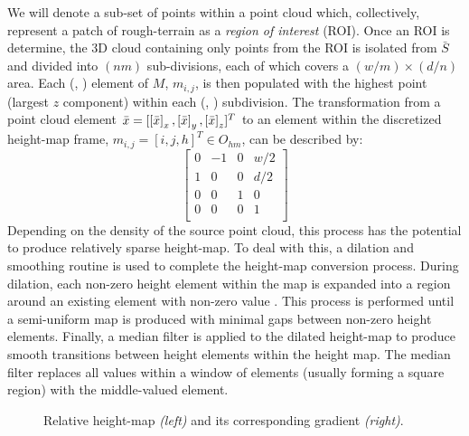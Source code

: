 			We will denote a sub-set of points within a point cloud which, collectively, represent a patch of rough-terrain as a \emph{region of interest} (ROI). Once an ROI is determine, the 3D cloud containing only points from the ROI is isolated from $\bar{S}$ and divided into $(nm)$ sub-divisions, each of which covers a $(w/m) \times (d/n)$ area. Each (\Ith, \Jth) element of $M$, $m_{i,j}$, is then populated with the highest point (largest  $z$ component) within each  (\Ith, \Jth) subdivision. The transformation from a point cloud element $\bar{x} = [\left[\bar{x}\right]_{x},\left[\bar{x}\right]_{y},\left[\bar{x}\right]_{z}]^{T}$ to an element within the discretized height-map frame, $m_{i,j} = [i,j,h]^{T} \in O_{hm}$, can be described by:
				\begin{equation}
					\left[
						\begin{array}{ccc|c}
						0 &-1 & 0 & w/2 \\
						1 & 0 & 0 & d/2 \\
						0 & 0 & 1 &  0  \\ \hline
						0 & 0 & 0 &  1  \\
						\end{array}
					\right]
				\end{equation}
			Depending on the density of the source point cloud, this process has the potential to produce relatively sparse height-map. To deal with this, a dilation and smoothing routine is used to complete the height-map conversion process. During dilation, each non-zero height element within the map is expanded into a region around an existing element with non-zero value \cite{opencv_learn_immorph}. This process is performed until a semi-uniform map is produced with minimal gaps between non-zero height elements. Finally, a median filter is applied to the dilated height-map to produce smooth transitions between height elements within the height map. The median filter replaces all values within a window of elements (usually forming a square region) with the middle-valued element.
				\begin{figure}[t!]
					\centering
					\caption{Relative height-map \emph{(left)} and its corresponding gradient \emph{(right)}.}
					\label{fig::heightmap_terrain_patch}
				\end{figure}

